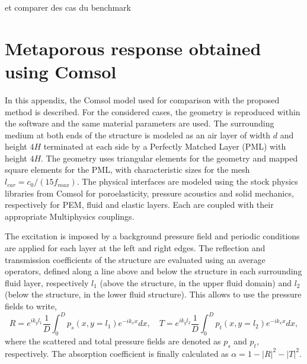 \appendix
et comparer des cas du benchmark
\section*{Metaporous response obtained using Comsol}

In this appendix, the Comsol model used for comparison with the proposed method is described. For the considered cases, the geometry is reproduced within the software and the same material parameters are used. The surrounding medium at both ends of the structure is modeled as an air layer of width $d$ and height $4H$ terminated at each side by a Perfectly Matched Layer (PML) with height $4H$. The geometry uses triangular elements for the geometry and mapped square elements for the PML, with characteristic sizes for the mesh $l_{car} = c_0/(15f_{max})$. The physical interfaces are modeled using the stock physics libraries from Comsol for poroelasticity, pressure acoustics and solid mechanics, respectively for PEM, fluid and elastic layers. Each are coupled with their appropriate Multiphysics couplings. 

The excitation is imposed by a background pressure field and periodic conditions are applied for each layer at the left and right edges. The reflection and transmission coefficients of the structure are evaluated using an average operators, defined along a line above and below the structure in each surrounding fluid layer, respectively $l_1$ (above the structure, in the upper fluid domain) and $l_2$ (below the structure, in the lower fluid structure). This allows to use the pressure fields to write,
\begin{equation}
    R = e^{ik_y l_1} \frac 1 D \int_0^D {p_s(x, y=l_1)} e^{-ik_x x} dx, \quad
    T = e^{ik_y l_2} \frac 1 D \int_0^D {p_t(x, y=l_2)} e^{-ik_x x} dx,
\end{equation}
where the scattered and total pressure fields are denoted as $p_s$ and $p_t$, respectively. The absorption coefficient is finally calculated as $\alpha = 1 - |R|^2 - |T|^2$.